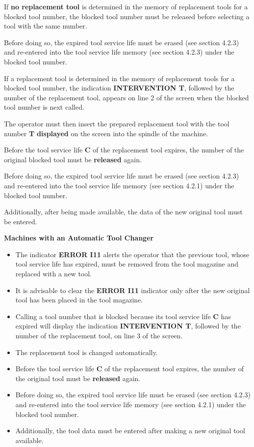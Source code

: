If \textbf{no replacement tool} is determined in the memory of replacement tools for a blocked tool number, the blocked tool number must be released before selecting a tool with the same number.

Before doing so, the expired tool service life must be erased (see section 4.2.3) and re-entered into the tool service life memory (see section 4.2.3) under the blocked tool number.

If a replacement tool is determined in the memory of replacement tools for a blocked tool number, the indication \textbf{INTERVENTION T}, followed by the number of the replacement tool, appears on line 2 of the screen when the blocked tool number is next called.

The operator must then insert the prepared replacement tool with the tool number \textbf{T} \textbf{displayed} on the screen into the spindle of the machine.

Before the tool service life \textbf{C} of the replacement tool expires, the number of the original blocked tool must be \textbf{released} again.

Before doing so, the expired tool service life must be erased (see section 4.2.3) and re-entered into the tool service life memory (see section 4.2.1) under the blocked tool number.

Additionally, after being made available, the data of the new original tool must be entered.

\newpage

\textbf{Machines with an Automatic Tool Changer}

\begin{itemize}
    \item The indicator \textbf{ERROR I11} alerts the operator that the previous tool, whose tool service life has expired, must be removed from the tool magazine and replaced with a new tool.

    \item It is advisable to clear the \textbf{ERROR I11} indicator only after the new original tool has been placed in the tool magazine.

    \item Calling a tool number that is blocked because its tool service life \textbf{C} has expired will display the indication \textbf{INTERVENTION T}, followed by the number of the replacement tool, on line 3 of the screen.
    
    \item The replacement tool is changed automatically.

    \item Before the tool service life \textbf{C} of the replacement tool expires, the number of the original tool must be \textbf{released} again.

    \item Before doing so, the expired tool service life must be erased (see section 4.2.3) and re-entered into the tool service life memory (see section 4.2.1) under the blocked tool number.

    \item Additionally, the tool data must be entered after making a new original tool available.
\end{itemize}

